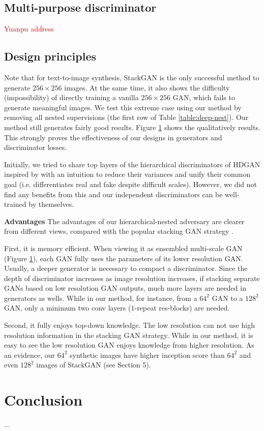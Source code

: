 \documentclass[10pt,twocolumn,letterpaper]{article}
\begin{document}
\subsection{Multi-purpose discriminator}
\textcolor{red}{Yuanpu address}

\begin{figure}[t]
	\centering
	\caption{} \label{fig:vallina-res}
\end{figure}


\subsection{Design principles}
Note that for text-to-image synthesis, StackGAN is the only successful method to generate $256{\times}256$ images.
At the same time, it also shows the difficulty (impossibility) of directly training a vanilla $256{\times}256$ GAN, which fails to generate meaningful images. 
We test this extreme case using our method by removing all nested supervisions (the first row of Table \ref{table:deep-nest}). Our method still generates fairly good results. Figure \ref{fig:vallina-res} shows the qualitatively results. This strongly proves the effectiveness of our designs in generators and discriminator losses.

Initially, we tried to share top layers of the hierarchical discriminators of HDGAN inspired by \cite{liu2017unsupervised} with an intuition to reduce their variances and unify their common goal (i.e. differentiates real and fake despite difficult scales). However, we did not find any benefits from this and our independent discriminators can be well-trained by themselves. 

\textbf{Advantages}
The advantages of our hierarchical-nested adversary are clearer from different views, compared with the popular stacking GAN strategy \cite{}. 

First, it is memory efficient. 
When viewing it as ensembled multi-scale GAN (Figure \ref{}), each GAN fully uses the parameters of its lower resolution GAN. Usually, a deeper generator is necessary to compact a discriminator. Since the depth of discriminator increases as image resolution increases, if stacking separate GANs based on low resolution GAN outputs, much more layers are needed in generators as wells. While in our method, for instance, from a $64^2$ GAN to a $128^2$ GAN, only a minimum two conv layers ($1$-repeat res-blocks) are needed. 

Second, it fully enjoys top-down knowledge. 
The low resolution can not use high resolution information in the stacking GAN strategy. While in our method, it is easy to see the low resolution GAN enjoys knowledge from higher resolution. As an evidence, our $64^2$ synthetic images have higher inception score than $64^2$ and even $128^2$ images of StackGAN (see Section 5).


\section{Conclusion}
...

{\small


}
\end{document}
